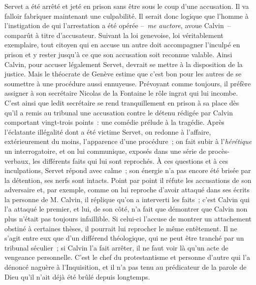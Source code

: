\documentclass[french,twoside]{book} %
\newcommand\foreign[1]{\emph{#1}}
\begin{document}
\noindent Servet a été arrêté et jeté en prison sans être sous le coup d’une accusation. Il va falloir fabriquer maintenant une culpabilité. Il serait donc logique que l’homme à l’instigation de qui l’arrestation a été opérée – \foreign{me auctore}, avoue Calvin – comparût à titre d’accusateur. Suivant la loi genevoise, loi véritablement exemplaire, tout citoyen qui en accuse un autre doit accompagner l’inculpé en prison et y rester jusqu’à ce que son accusation soit reconnue valable. Ainsi Calvin, pour accuser légalement Servet, devrait se mettre à la disposition de la justice. Mais le théocrate de Genève estime que c’est bon pour les autres de se soumettre à une procédure aussi ennuyeuse. Prévoyant comme toujours, il préfère assigner à son secrétaire Nicolas de la Fontaine le rôle ingrat qui lui incombe. C’est ainsi que ledit secrétaire se rend tranquillement en prison à sa place dès qu’il a remis au tribunal une accusation contre le détenu rédigée par Calvin comportant vingt-trois points : une comédie prélude à la tragédie. Après l’éclatante illégalité dont a été victime Servet, on redonne à l’affaire, extérieurement du moins, l’apparence d’une procédure ; on fait subir à l’\emph{hérétique} un interrogatoire, et on lui communique, exposés dans une série de procès-verbaux, les différents faits qui lui sont reprochés. À ces questions et à ces inculpations, Servet répond avec calme ; son énergie n’a pas encore été brisée par la détention, ses nerfs sont intacts. Point par point il réfute les accusations de son adversaire et, par exemple, comme on lui reproche d’avoir attaqué dans ses écrits la personne de M. Calvin, il réplique qu’on a interverti les faits ; c’est Calvin qui l’a attaqué le premier, et lui, de son côté, n’a fait que démontrer que Calvin non plus n’était pas toujours infaillible. Si celui-ci l’accuse de montrer un attachement obstiné à certaines thèses, il pourrait lui reprocher le même entêtement. Il ne s’agit entre eux que d’un différend théologique, qui ne peut être tranché par un tribunal séculier ; si Calvin l’a fait arrêter, il ne faut voir là qu’un acte de vengeance personnelle. C’est le chef du protestantisme et personne d’autre qui l’a dénoncé naguère à l’Inquisition, et il n’a pas tenu au prédicateur de la parole de Dieu qu’il n’ait déjà été brûlé depuis longtemps.\par
\end{document}
